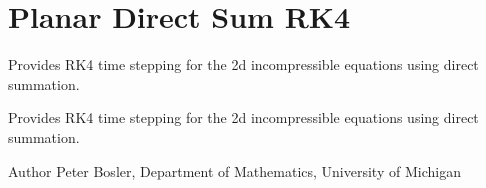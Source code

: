\hypertarget{group___plane_direct_sum}{\section{Planar Direct Sum R\+K4}
\label{group___plane_direct_sum}
}


Provides R\+K4 time stepping for the 2d incompressible equations using direct summation.  


Provides R\+K4 time stepping for the 2d incompressible equations using direct summation. 

\begin{DoxyAuthor}{Author}
Peter Bosler, Department of Mathematics, University of Michigan 
\end{DoxyAuthor}

